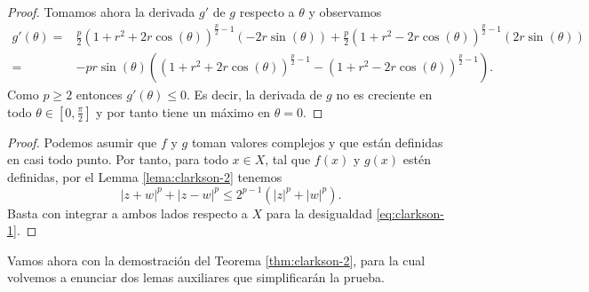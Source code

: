 \begin{proof}
    Tomamos ahora la derivada $g'$ de $ g $ respecto a $ \theta $ y observamos
    \begin{align}
        g'(\theta) = &\frac{p}{2}(1 + r^2 + 2r \cos(\theta))^{\frac{p}{2}-1} (-2r \sin(\theta)) + \frac{p}{2}(1 + r^2 - 2r \cos(\theta))^{\frac{p}{2}-1} (2r \sin(\theta)) \\
        = &-pr \sin(\theta) \left((1+r^2 + 2r\cos(\theta))^{\frac{p}{2}-1} - (1+r^2 - 2r\cos(\theta))^{\frac{p}{2}-1}\right).
    \end{align}
    Como $ p \geq 2 $ entonces $g'(\theta) \leq 0 $. Es decir, la derivada de $ g $ no es creciente en todo $ \theta \in \left[0, \frac{\pi}{2}\right] $ y por tanto tiene un máximo en $ \theta = 0 $.
\end{proof}

\Clarksoni
\begin{proof}
    Podemos asumir que $ f $ y $ g $ toman valores complejos y que están definidas en casi todo punto. Por tanto, para todo $ x \in X $, tal que $ f(x) $ y $ g(x) $ estén definidas, por el Lemma \ref{lema:clarkson-2} tenemos
    \begin{equation}
        \left| z + w \right|^p + \left| z - w \right|^p \leq 2^{p-1} \left( |z|^p + |w|^p \right).
    \end{equation}
    Basta con integrar a ambos lados respecto a $ X $ para la desigualdad \eqref{eq:clarkson-1}.
\end{proof}

Vamos ahora con la demostración del Teorema \ref{thm:clarkson-2}, para la cual volvemos a enunciar dos lemas auxiliares que simplificarán la prueba.

